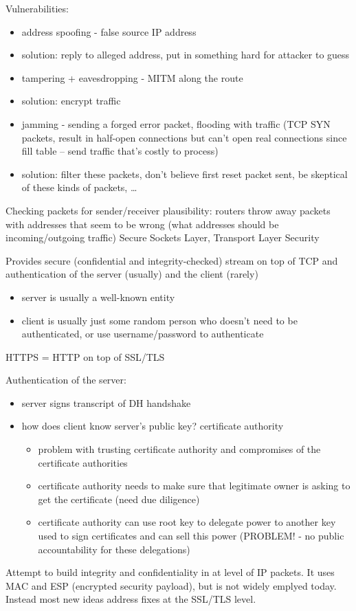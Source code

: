 Vulnerabilities:
\begin{itemize}
    \item address spoofing - false source IP address
    \item solution: reply to alleged address, put in something hard for attacker
        to guess
    \item tampering + eavesdropping - MITM along the route
    \item solution: encrypt traffic
    \item jamming - sending a forged error packet, flooding with traffic (TCP
        SYN packets, result in half-open connections but can't open real
        connections since fill table -- send traffic that's costly to process)
    \item solution: filter these packets, don't believe first reset packet sent,
        be skeptical of these kinds of packets, \dots
\end{itemize}
Checking packets for sender/receiver plausibility: routers throw away packets
with addresses that seem to be wrong (what addresses should be incoming/outgoing
traffic)
Secure Sockets Layer, Transport Layer Security

Provides secure (confidential and integrity-checked) stream on top of TCP and
authentication of the server (usually) and the client (rarely)
\begin{itemize}
    \item server is usually a well-known entity
    \item client is usually just some random person who doesn't need to be
        authenticated, or use username/password to authenticate
\end{itemize}
HTTPS = HTTP on top of SSL/TLS

Authentication of the server:
\begin{itemize}
    \item server signs transcript of DH handshake
    \item how does client know server's public key? certificate authority
    \begin{itemize}
        \item problem with trusting certificate authority and compromises of the
            certificate authorities
        \item certificate authority needs to make sure that legitimate owner is
            asking to get the certificate (need due diligence)
        \item certificate authority can use root key to delegate power to
            another key used to sign certificates and can sell this power
            (PROBLEM! - no public accountability for these delegations)
    \end{itemize}
\end{itemize}
Attempt to build integrity and confidentiality in at level of IP packets.
It uses MAC and ESP (encrypted security payload), but is not widely emplyed
today. Instead most new ideas address fixes at the SSL/TLS level.
